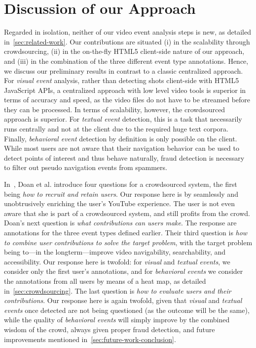 \documentclass[runningheads,a4paper]{llncs}
\begin{document}
\vspace{-5mm}
\section{Discussion of our Approach}
Regarded in isolation, neither of our video event analysis steps is new, as detailed in~\autoref{sec:related-work}. Our contributions are situated (i) in the scalability through crowdsourcing, (ii) in the on-the-fly HTML5 client-side nature of our approach, and (iii) in the combination of the three different event type annotations. Hence, we discuss our preliminary results in contrast to a classic centralized approach. For \emph{visual event} analysis, rather than detecting shots client-side with HTML5 Java\-Script APIs, a centralized approach with low level video tools is superior in terms of accuracy and speed, as the video files do not have to be streamed before they can be processed. In terms of scalability, however, the crowdsourced approach is superior. For \emph{textual event} detection, this is a task that necessarily runs centrally and not at the client due to the required huge text corpora. Finally, \emph{behavioral event} detection by definition is only possible on the client. While most users are not aware that their navigation behavior can be used to detect points of interest and thus behave naturally, fraud detection is necessary to filter out pseudo navigation events from spammers.

In~\cite{Doan:2011}, Doan et al. introduce four questions for a crowdsourced system, the first being \textit{how to recruit and retain users}. Our response here is by seamlessly and unobtrusively enriching the user's YouTube experience. The user is not even aware that she is part of a crowdsourced system, and still profits from the crowd. Doan's next question is \textit{what contributions can users make}. The response are annotations for the three event types defined earlier. Their third question is \textit{how to combine user contributions to solve the target problem}, with the target problem being to---in the longterm---improve video navigability, searchability, and accessibility.  Our response here is twofold: for \emph{visual} and \emph{textual events}, we consider only the first user's annotations, and for \emph{behavioral events} we consider the annotations from all users by means of a heat map, as detailed in~\autoref{sec:crowdsourcing}. The last question is \textit{how to evaluate users and their contributions}. Our response here is again twofold, given that \emph{visual} and \emph{textual events} once detected are not being questioned (as the outcome will be the same), while the quality of \emph{behavioral events}  will simply improve by the combined wisdom of the crowd, always given proper fraud detection, and future improvements mentioned in~\autoref{sec:future-work-conclusion}.
\end{document}

